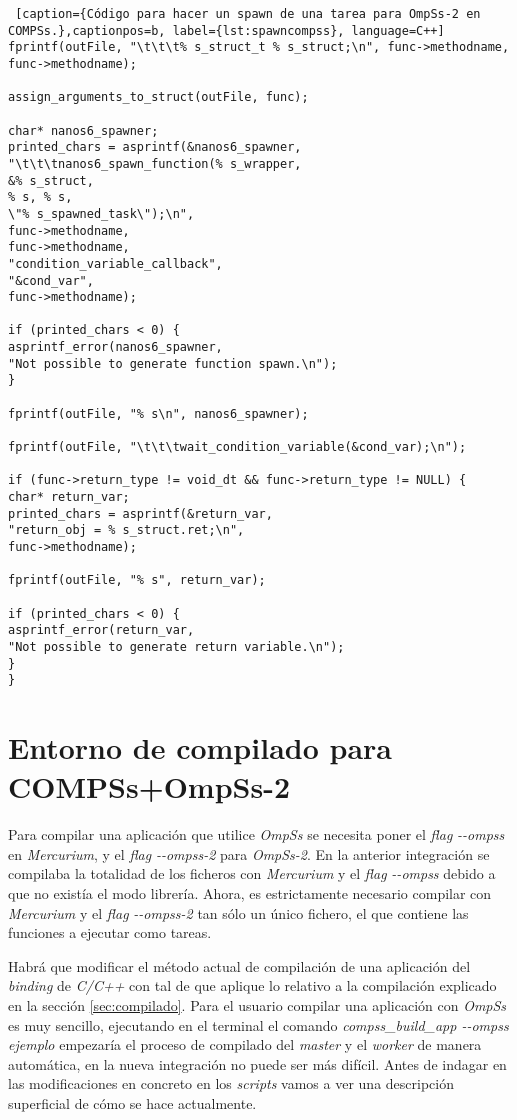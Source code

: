 \begin{minipage}{\linewidth}
\begin{lstlisting} [caption={Código para hacer un spawn de una tarea para OmpSs-2 en COMPSs.},captionpos=b, label={lst:spawncompss}, language=C++]
fprintf(outFile, "\t\t\t% s_struct_t % s_struct;\n", func->methodname, 
func->methodname);

assign_arguments_to_struct(outFile, func);

char* nanos6_spawner;
printed_chars = asprintf(&nanos6_spawner, 
"\t\t\tnanos6_spawn_function(% s_wrapper,
&% s_struct, 
% s, % s, 
\"% s_spawned_task\");\n",
func->methodname, 
func->methodname, 
"condition_variable_callback", 
"&cond_var", 
func->methodname);

if (printed_chars < 0) {
asprintf_error(nanos6_spawner, 
"Not possible to generate function spawn.\n");
}

fprintf(outFile, "% s\n", nanos6_spawner);

fprintf(outFile, "\t\t\twait_condition_variable(&cond_var);\n");

if (func->return_type != void_dt && func->return_type != NULL) {
char* return_var;
printed_chars = asprintf(&return_var, 
"return_obj = % s_struct.ret;\n", 
func->methodname);

fprintf(outFile, "% s", return_var);

if (printed_chars < 0) {
asprintf_error(return_var, 
"Not possible to generate return variable.\n");
}
}
\end{lstlisting}
\end{minipage}

\bigskip
\section{Entorno de compilado para COMPSs+OmpSs-2}

Para compilar una aplicación que utilice \textit{OmpSs} se necesita poner el \textit{flag} \textit{-{}-ompss} en \textit{Mercurium}, y el \textit{flag} \textit{-{}-ompss-2} para \textit{OmpSs-2}. En la anterior integración se compilaba la totalidad de los ficheros con \textit{Mercurium} y el \textit{flag} \textit{-{}-ompss} debido a que no existía el modo librería. Ahora, es estrictamente necesario compilar con \textit{Mercurium} y el \textit{flag} \textit{-{}-ompss-2} tan sólo un único fichero, el que contiene las funciones a ejecutar como tareas. 
\par\bigskip
Habrá que modificar el método actual de compilación de una aplicación del \textit{binding} de \textit{C/C++} con tal de que aplique lo relativo a la compilación explicado en la sección \ref{sec:compilado}. Para el usuario compilar una aplicación con \textit{OmpSs} es muy sencillo, ejecutando en el terminal el comando \textit{compss\_build\_app -{}-ompss ejemplo} empezaría el proceso de compilado del \textit{master} y el \textit{worker} de manera automática, en la nueva integración no puede ser más difícil. Antes de indagar en las modificaciones en concreto en los \textit{scripts} vamos a ver una descripción superficial de cómo se hace actualmente.


